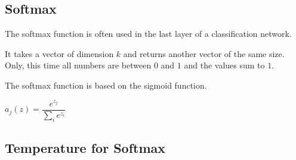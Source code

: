 
\subsection{Softmax}

The softmax function is often used in the last layer of a classification network.

It takes a vector of dimension \(k\) and returns another vector of the same size. Only, this time all numbers are between \(0\) and \(1\) and the values sum to \(1\).

The softmax function is based on the sigmoid function.

\(a_j(z)=\dfrac{e^{z_j}}{\sum_{i}e^{z_i}}\)

\subsection{Temperature for Softmax}



